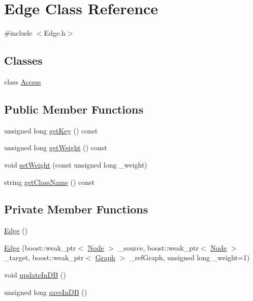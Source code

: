 \hypertarget{class_edge}{}\section{Edge Class Reference}
\label{class_edge}


{\ttfamily \#include $<$Edge.\+h$>$}

\subsection*{Classes}
\begin{DoxyCompactItemize}
\item 
class \hyperlink{class_edge_1_1_access}{Access}
\end{DoxyCompactItemize}
\subsection*{Public Member Functions}
\begin{DoxyCompactItemize}
\item 
unsigned long \hyperlink{class_edge_ab8c30be0af32c0f5860f6fce10d00aa0}{get\+Key} () const 
\item 
unsigned long \hyperlink{class_edge_a547927a1b370ba92c588739878007387}{get\+Weight} () const 
\item 
void \hyperlink{class_edge_a5cf0bdf3dd6145b94b338a488b2a8862}{set\+Weight} (const unsigned long \+\_\+weight)
\item 
string \hyperlink{class_edge_afe354a2942189ee2341f1cf5c09da99d}{get\+Class\+Name} () const 
\end{DoxyCompactItemize}
\subsection*{Private Member Functions}
\begin{DoxyCompactItemize}
\item 
\hyperlink{class_edge_a3106b11d60125009dbf7a738ce540fdf}{Edge} ()
\item 
\hyperlink{class_edge_a99e32803227c038106639106980435ec}{Edge} (boost\+::weak\+\_\+ptr$<$ \hyperlink{class_node}{Node} $>$ \+\_\+source, boost\+::weak\+\_\+ptr$<$ \hyperlink{class_node}{Node} $>$ \+\_\+target, boost\+::weak\+\_\+ptr$<$ \hyperlink{class_graph}{Graph} $>$ \+\_\+ref\+Graph, unsigned long \+\_\+weight=1)
\item 
void \hyperlink{class_edge_a22f735344e146d1db9c4207fdf31235d}{update\+In\+D\+B} ()
\item 
unsigned long \hyperlink{class_edge_a64b3d45f279438077d5af17051ddf799}{save\+In\+D\+B} ()
\end{DoxyCompactItemize}
